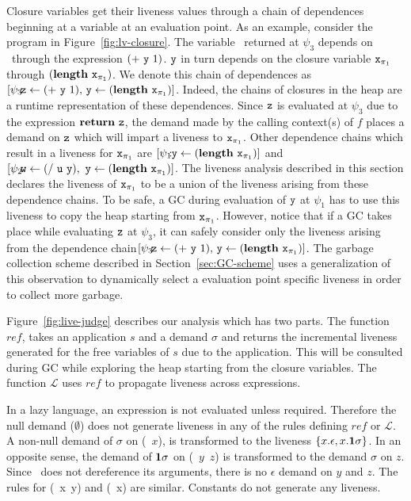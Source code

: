 \documentclass[9pt,preprint,letter,nonatbib]{sigplanconf}
\begin{document}
 
Closure  variables get  their  liveness values  through  a chain  of
dependences beginning at  a variable at an evaluation  point.  As an
example, consider the program in Figure~\ref{fig:lv-closure}.
The variable  \pz\ returned  at $\psi_3$ depends  on \py\  through the
expression $(+~\mbox{\tt y}~1)$.  $\mbox{\tt y}$ in turn depends on the closure variable
$\mbox{\tt x}_{\mathit{\pi}_1}$  through $(\mathbf{length}~\mbox{\tt x}_{\mathit{\pi}_1})$.   We
denote this  chain of  dependences as  $\lbrack \psi_3\!\!\!:\!\!\!\mbox{\tt z}
\leftarrow            (+~\mbox{\tt y}~1),\,           \mbox{\tt y}            \leftarrow
(\mathbf{length}~\mbox{\tt x}_{\mathit{\pi}_1})\rbrack$.  Indeed,  the chains of closures  in the
heap are a  runtime representation of these  dependences.  Since $\mbox{\tt z}$
is evaluated  at $\psi_3$  due to  the expression  $\mbox{$\mathbf{ return}$}~\mbox{\tt z}$, the
demand made by the calling context(s)  of $f$ places a demand on $\mbox{\tt z}$
which  will  impart a  liveness  to  $\mbox{\tt x}_{\pi_1}$.  Other  dependence
chains  which result  in  a liveness  for  $\mbox{\tt x}_{\pi_1}$ are  $\lbrack
\psi_1\!\!\!:\!\!\mbox{\tt y}   \leftarrow  (\mathbf{length}~\mbox{\tt x}_{\pi_1})\rbrack$   and
$\lbrack   \psi_2\!\!\!:\!\!\!\mbox{\tt w}   \leftarrow  (/~\mbox{\tt u}~\mbox{\tt y}),\,\,   \mbox{\tt y}
\leftarrow   (\mathbf{length}~\mbox{\tt x}_{\pi_1})\rbrack$.   The   liveness  analysis
described in this section declares the liveness of $\mbox{\tt x}_{\pi_1}$ to be
a union of  the liveness arising from these dependence  chains.  To be
safe, a GC during  evaluation of $\mbox{\tt y}$ at $\psi_1$ has
to use  this liveness to  copy the heap starting from  $\mbox{\tt x}_{\pi_1}$.  However,
notice that if a GC takes place while evaluating $\mbox{\tt z}$
at $\psi_3$, it can safely consider only the liveness arising from the
dependence chain\linebreak  $\lbrack \psi_3\!\!\!:\!\!\!\mbox{\tt z} \leftarrow
(+~\mbox{\tt y}~1),\, \mbox{\tt y} \leftarrow (\mathbf{length}~\mbox{\tt x}_{\pi_1})\rbrack$.  The garbage
collection  scheme  described  in Section~\ref{sec:GC-scheme}  uses  a
generalization of this observation  to dynamically select a evaluation
point specific liveness in order to collect more garbage.



Figure~\ref{fig:live-judge}  describes  our  analysis  which  has  two
parts. The  function $\mathit{ref}$,  takes an  application $s$  and a
demand $\sigma$ and returns the incremental liveness generated for the
free variables of $s$ due to  the application.  This will be consulted
during GC  while exploring the heap  starting from the
closure  variables.  The function $\mathcal{L}$  uses  $\mathit{ref}$ to  propagate
liveness across expressions.

In  a   lazy  language,   an  expression   is  not   evaluated  unless
required. Therefore  the null  demand ($\emptyset$) does  not generate
liveness in any of the rules defining $\mathit{ref}$ or $\mathcal{L}$.
A non-null  demand of  $\sigma$ on (\CDR~$x$),  is transformed  to the
liveness $\{x.\epsilon,  x.\mathbf{1}\sigma\}$.  In an opposite  sense, the
demand  of  $\mathbf{1}\sigma$ on  (\CONS~$y$~$z$)  is  transformed to  the
demand  $\sigma$  on  $z$.   Since \CONS\  does  not  dereference  its
arguments, there  is no $\epsilon$ demand  on $y$ and $z$.   The rules
for (\PRIM~x~y) and (\NULLQ~x) are  similar. Constants do not generate
any liveness.
\end{document}
